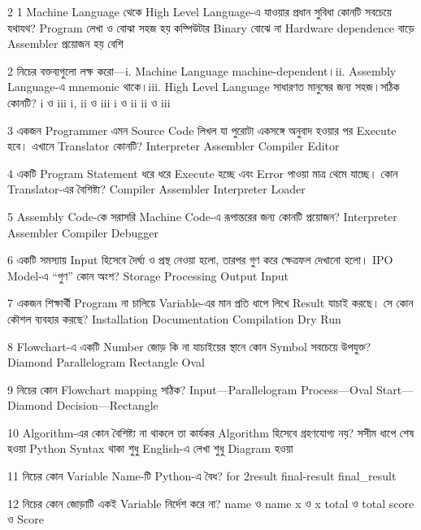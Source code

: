 \begin{multicols}{2}
\setlength{\columnsep}{4mm}
\raggedcolumns
\mcqwide
{1}
{Machine Language থেকে High Level Language-এ যাওয়ার প্রধান সুবিধা কোনটি সবচেয়ে যথাযথ?}
{Program লেখা ও বোঝা সহজ হয়}
{কম্পিউটার Binary বোঝে না}
{Hardware dependence বাড়ে}
{Assembler প্রয়োজন হয় বেশি}

\mcqwide
{2}
{নিচের বক্তব্যগুলো লক্ষ করো—\newline i. Machine Language machine-dependent।\newline ii. Assembly Language-এ mnemonic থাকে।\newline iii. High Level Language সাধারণত মানুষের জন্য সহজ।\newline সঠিক কোনটি?}
{i ও iii}
{i, ii ও iii}
{i ও ii}
{ii ও iii}

\mcq
{3}
{একজন Programmer এমন Source Code লিখল যা পুরোটা একসঙ্গে অনুবাদ হওয়ার পর Execute হবে। এখানে Translator কোনটি?}
{Interpreter}
{Assembler}
{Compiler}
{Editor}

\mcq
{4}
{একটি Program Statement ধরে ধরে Execute হচ্ছে এবং Error পাওয়া মাত্র থেমে যাচ্ছে। কোন Translator-এর বৈশিষ্ট্য?}
{Compiler}
{Assembler}
{Interpreter}
{Loader}

\mcq
{5}
{Assembly Code-কে সরাসরি Machine Code-এ রূপান্তরের জন্য কোনটি প্রয়োজন?}
{Interpreter}
{Assembler}
{Compiler}
{Debugger}

\mcq
{6}
{একটি সমস্যায় Input হিসেবে দৈর্ঘ্য ও প্রস্থ নেওয়া হলো, তারপর গুণ করে ক্ষেত্রফল দেখানো হলো। IPO Model-এ “গুণ” কোন অংশ?}
{Storage}
{Processing}
{Output}
{Input}

\mcq
{7}
{একজন শিক্ষার্থী Program না চালিয়ে Variable-এর মান প্রতি ধাপে লিখে Result যাচাই করছে। সে কোন কৌশল ব্যবহার করছে?}
{Installation}
{Documentation}
{Compilation}
{Dry Run}

\mcq
{8}
{Flowchart-এ একটি Number জোড় কি না যাচাইয়ের স্থানে কোন Symbol সবচেয়ে উপযুক্ত?}
{Diamond}
{Parallelogram}
{Rectangle}
{Oval}

\mcq
{9}
{নিচের কোন Flowchart mapping সঠিক?}
{Input—Parallelogram}
{Process—Oval}
{Start—Diamond}
{Decision—Rectangle}

\mcq
{10}
{Algorithm-এর কোন বৈশিষ্ট্য না থাকলে তা কার্যকর Algorithm হিসেবে গ্রহণযোগ্য নয়?}
{সসীম ধাপে শেষ হওয়া}
{Python Syntax থাকা}
{শুধু English-এ লেখা}
{শুধু Diagram হওয়া}

\mcq
{11}
{নিচের কোন Variable Name-টি Python-এ বৈধ?}
{for}
{2result}
{final-result}
{final\_result}

\mcq
{12}
{নিচের কোন জোড়াটি একই Variable নির্দেশ করে না?}
{name ও name}
{x ও x}
{total ও total}
{score ও Score}


\end{multicols}
